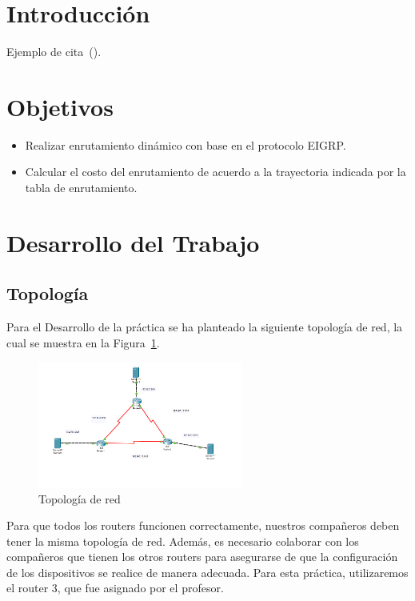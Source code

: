 \setcounter{page}{1}


\section{Introducción}
    Ejemplo de cita~(\cite{buffett84}).
\section{Objetivos}
    \begin{itemize}
        \item Realizar enrutamiento dinámico con base en el protocolo EIGRP.
        \item Calcular el costo del enrutamiento de acuerdo a la trayectoria indicada por la tabla de enrutamiento.
    \end{itemize}

\section{Desarrollo del Trabajo}
    \subsection{Topología}
        Para el Desarrollo de la práctica se ha planteado la siguiente topología de red, la cual se muestra en la Figura~\ref{fig:topologia}.
    \begin{figure}[H]
        \centering
        \includegraphics[width=0.6\textwidth]{img/Topologia.png}
        \caption{Topología de red}
        \label{fig:topologia}
    \end{figure}

    Para que todos los routers funcionen correctamente, nuestros compañeros deben tener la misma topología de red. Además, es necesario colaborar con los compañeros que tienen los otros routers para asegurarse de que la configuración de los dispositivos se realice de manera adecuada. Para esta práctica, utilizaremos el router 3, que fue asignado por el profesor.
    
